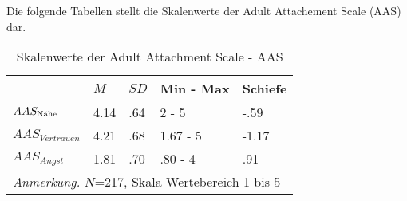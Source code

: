 Die folgende Tabellen stellt die Skalenwerte der Adult Attachement Scale (AAS) dar.

\begin{table}[ht]
\centering
\captionsetup{margin=80pt,skip=5pt}
\caption{Skalenwerte der Adult Attachment Scale - AAS}
\label{table:AppAASDeskriptiv}
\begin{tabular}{m{6em} m{3em}  m{3em}  m{5em} m{3em}} 
  \hline
  & $M$ & $SD$ & Min - Max & Schiefe\\
  \hline
  $AAS_{\textnormal{Nähe}}$ & 4.14 & .64 & 2 - 5 & -.59\\
  $AAS_{Vertrauen}$ & 4.21 & .68 & 1.67 - 5 & -1.17\\
  $AAS_{Angst}$ & 1.81 & .70 & .80 - 4 & .91 \\
  \hline
  \multicolumn{5}{l}{\textit{Anmerkung.} $N$=217, Skala Wertebereich 1 bis 5}\\
\end{tabular}
\end{table}
